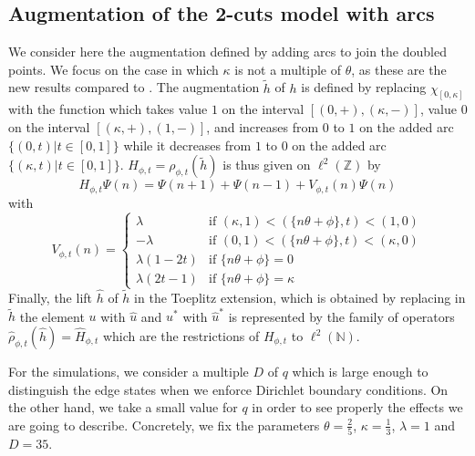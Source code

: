 \documentclass[11pt]{amsart}
\newcommand{\Z}{\mathbb{Z}}
\newcommand{\N}{\mathbb{N}}
\newcommand{\cut}{\kappa}
\newcommand{\q}{q}
\begin{document}
\subsection{Augmentation of the 2-cuts model with arcs} We consider here the augmentation defined by adding arcs to join the doubled points. We focus on the case in which $\cut$ is not a multiple of $\theta$, as these are the new results compared to \cite{kellendonk_prodan}. 
The augmentation $\tilde h$ of $h$ is defined by replacing $\chi_{[0, \cut]}$ with the function which takes value $1$ on the interval $[(0,+),(\cut,-)]$, value $0$ on the interval $[(\cut,+),(1,-)]$, and increases from $0$ to $1$ on the added arc $\{(0,t)| t\in [0,1]\}$ while it decreases from $1$ to $0$ on the added arc $\{(\cut,t)| t\in [0,1]\}$. $H_{\phi,t}=\rho_{\phi,t}(\tilde h)$ is thus given on $\ell^2(\Z)$ by 
$$H_{\phi,t} \Psi(n)=\Psi(n+1)+\Psi(n-1)+V_{\phi,t}(n) \Psi(n)$$
with 
\begin{equation}%
	V_{\phi,t}(n) = \left\{\begin{array}{ll}
\lambda & \mbox{if } (\cut,1) < (\{n\theta+\phi\},t) < (1,0) \\
-\lambda & \mbox{if } (0,1) < (\{n\theta+\phi\},t) < (\cut,0)\\
\lambda (1-2t) & \mbox{if } \{n\theta+\phi\} = 0\\
\lambda (2t-1) & \mbox{if } \{n\theta+\phi\} = \cut
\end{array}\right.
\end{equation}
Finally, the lift $\hat h$ of $\tilde h$ in the Toeplitz extension, which is obtained by replacing in $\tilde h$ the element $u$ with $\hat u$ and $u^*$ with ${\hat u}^*$ is represented by the family of operators 
$\hat\rho_{\phi,t}(\hat h)=\hat{H}_{\phi,t}$ which are the restrictions of $H_{\phi,t}$ to $\ell^2(\N)$.

For the simulations, we consider a multiple $D$ of $\q$ which is large enough to distinguish the edge states when we enforce Dirichlet boundary conditions. On the other hand, we take a small value for $\q$ in order to see properly the effects we are going to describe. 
Concretely, we fix the parameters $\theta = \frac{2}{5}$, $\cut=\frac{1}{3}$, $\lambda=1$ and $D=35$. 
\end{document}
